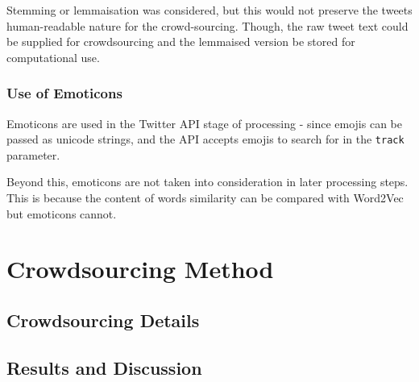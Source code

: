 \documentclass{mproj}
\begin{document}
Stemming or lemmaisation was considered, but this would not preserve the tweets human-readable nature for the crowd-sourcing. Though, the raw tweet text could be supplied for crowdsourcing and the lemmaised version be stored for computational use.

\subsubsection{Use of Emoticons}

Emoticons are used in the Twitter API stage of processing - since emojis can be passed as unicode strings, and the API accepts emojis to search for in the \lstinline{track} parameter.

Beyond this, emoticons are not taken into consideration in later processing steps. This is because the content of words similarity can be compared with Word2Vec but emoticons cannot.

\section{Crowdsourcing Method}
\subsection{Crowdsourcing Details}
\subsection{Results and Discussion}

%
%
\end{document}

